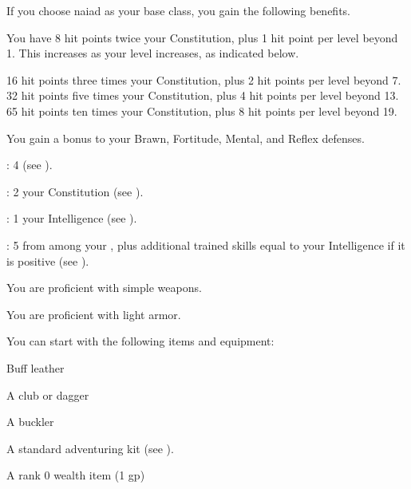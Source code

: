     If you choose naiad as your base class, you gain the following benefits.

      You have 8 hit points \add twice your Constitution, plus 1 hit point per level beyond 1.
      This increases as your level increases, as indicated below.
      \begin{raggeditemize}
         16 hit points \add three times your Constitution, plus 2 hit points per level beyond 7.
         32 hit points \add five times your Constitution, plus 4 hit points per level beyond 13.
         65 hit points \add ten times your Constitution, plus 8 hit points per level beyond 19.
      \end{raggeditemize}

      You gain a  bonus to your Brawn, Fortitude, Mental, and Reflex defenses.

      \begin{raggeditemize}
          \item {}: 4 (see ).
          \item {}: 2 \add your Constitution (see ).
          \item {}: 1 \add your Intelligence (see ).
          \item {}: 5 from among your , plus additional trained skills equal to your Intelligence if it is positive (see ).
      \end{raggeditemize}

      You are proficient with simple weapons.

      You are proficient with light armor.
 
    You can start with the following items and equipment:
    \begin{raggeditemize}
        \item Buff leather
        \item A club or dagger
        \item A buckler
        \item A standard adventuring kit (see ).
        \item A rank 0 wealth item (1 gp)
    \end{raggeditemize}

